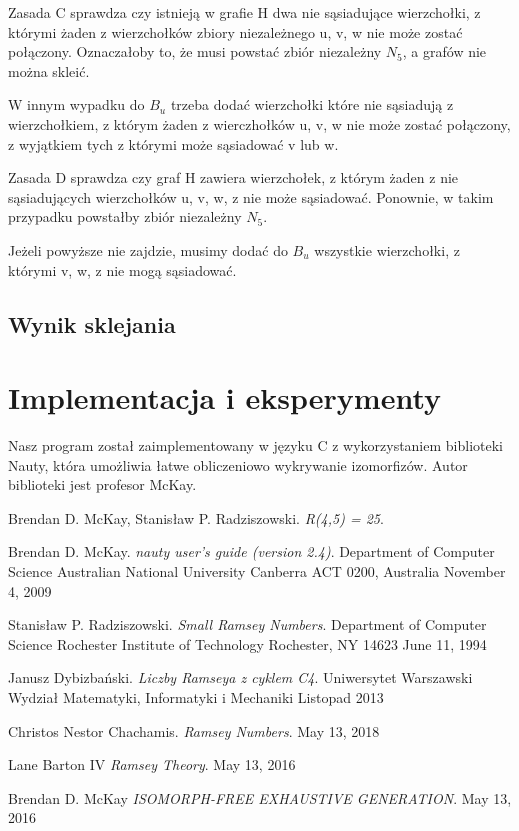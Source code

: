\documentclass[11pt]{article}
\begin{document}
Zasada C sprawdza czy istnieją w grafie H dwa nie sąsiadujące wierzchołki, z którymi żaden z wierzchołków zbiory niezależnego u, v, w nie może zostać połączony. 
Oznaczałoby to, że musi powstać zbiór niezależny $N_5$, a grafów nie można skleić.

W innym wypadku do $B_u$ trzeba dodać wierzchołki które nie sąsiadują z wierzchołkiem, 
z którym żaden z wierczhołków u, v, w nie może zostać połączony, z wyjątkiem tych z którymi może sąsiadować v lub w.  \linebreak

Zasada D sprawdza czy graf H zawiera wierzchołek, z którym żaden z nie sąsiadujących wierzchołków u, v, w, z
nie może sąsiadować. Ponownie, w takim przypadku powstałby zbiór niezależny $N_5$.

Jeżeli powyższe nie zajdzie, musimy dodać do $B_u$ wszystkie wierzchołki, z którymi v, w, z nie mogą sąsiadować. 

\subsection{Wynik sklejania}


\section{Implementacja i eksperymenty}
Nasz program został zaimplementowany w języku C z wykorzystaniem biblioteki Nauty, która umożliwia łatwe obliczeniowo wykrywanie izomorfizów.
Autor biblioteki jest profesor McKay. 

\begin{thebibliography}{9}
  Brendan D. McKay, Stanisław P. Radziszowski. 
  \textit{R(4,5) = 25}. 
  
  Brendan D. McKay.
  \textit{nauty user's guide (version 2.4)}.  
  Department of Computer Science
  Australian National University
  Canberra ACT 0200, Australia
  November 4, 2009

  Stanisław P. Radziszowski.
  \textit{Small Ramsey Numbers}.  
  Department of Computer Science Rochester Institute of Technology Rochester, NY 14623
  June 11, 1994

  Janusz Dybizbański.
  \textit{Liczby Ramseya z cyklem C4}.  
  Uniwersytet Warszawski
  Wydział Matematyki, Informatyki i Mechaniki
  Listopad 2013

  Christos Nestor Chachamis.
  \textit{Ramsey Numbers}.  
  May 13, 2018

  Lane Barton IV
  \textit{Ramsey Theory}.  
  May 13, 2016

  Brendan D. McKay
  \textit{ISOMORPH-FREE EXHAUSTIVE GENERATION}.  
  May 13, 2016

  \end{thebibliography}
\end{document}
